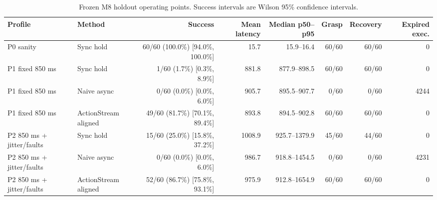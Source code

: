 \begin{table}[t]
\centering
\caption{Frozen M8 holdout operating points. Success intervals are Wilson 95\% confidence intervals.}
\label{tab:m8-holdout}
\begin{tabular}{llrrrrrr}
\toprule
Profile & Method & Success & Mean latency & Median p50--p95 & Grasp & Recovery & Expired exec. \\
\midrule
P0 sanity & Sync hold & 60/60 (100.0\%) [94.0\%, 100.0\%] & 15.7 & 15.9--16.4 & 60/60 & 60/60 & 0 \\
P1 fixed 850 ms & Sync hold & 1/60 (1.7\%) [0.3\%, 8.9\%] & 881.8 & 877.9--898.5 & 60/60 & 60/60 & 0 \\
P1 fixed 850 ms & Naive async & 0/60 (0.0\%) [0.0\%, 6.0\%] & 905.7 & 895.5--907.7 & 0/60 & 0/60 & 4244 \\
P1 fixed 850 ms & ActionStream aligned & 49/60 (81.7\%) [70.1\%, 89.4\%] & 893.8 & 894.5--902.8 & 60/60 & 60/60 & 0 \\
P2 850 ms + jitter/faults & Sync hold & 15/60 (25.0\%) [15.8\%, 37.2\%] & 1008.9 & 925.7--1379.9 & 45/60 & 44/60 & 0 \\
P2 850 ms + jitter/faults & Naive async & 0/60 (0.0\%) [0.0\%, 6.0\%] & 986.7 & 918.8--1454.5 & 0/60 & 0/60 & 4231 \\
P2 850 ms + jitter/faults & ActionStream aligned & 52/60 (86.7\%) [75.8\%, 93.1\%] & 975.9 & 912.8--1654.9 & 60/60 & 60/60 & 0 \\
\bottomrule
\end{tabular}
\end{table}
